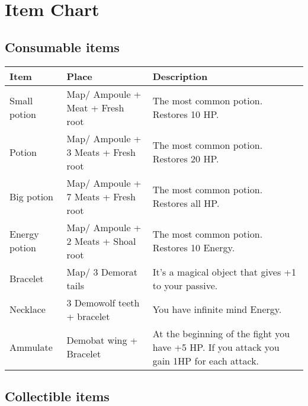 \section{Item Chart}

\subsection{Consumable items}
\vspace*{0.5cm}

\begin{center}
	\begin{tabular}[c]{| p{2cm} | p{} | p{5cm} |}
		\hline
		Item &  Place & Description \\
		\hline
		Small potion & Map/ Ampoule + Meat + Fresh root & The most common potion. Restores 10 HP.\\
		\hline
		Potion & Map/ Ampoule + 3 Meats + Fresh root & The most common potion. Restores 20 HP.\\
		\hline
		Big potion & Map/ Ampoule + 7 Meats + Fresh root & The most common potion. Restores all HP.\\
		\hline
		Energy potion & Map/ Ampoule + 2 Meats + Shoal root & The most common potion. Restores 10 Energy.\\
		\hline
		Bracelet & Map/ 3 Demorat tails & It's a magical object that gives +1 to your passive.\\
		\hline
		Necklace & 3 Demowolf teeth + bracelet & You have infinite mind Energy.\\
		\hline
		Ammulate & Demobat wing + Bracelet & 
		At the beginning of the fight you have +5 HP. If you attack you gain 1HP for each attack.\\
		\hline
	\end{tabular}
\end{center}

\subsection{Collectible items}
\vspace*{0.5cm}

